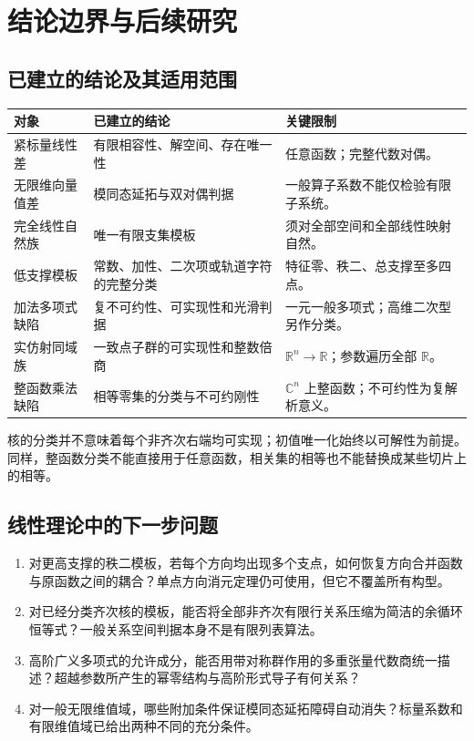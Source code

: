 \documentclass[11pt,a4paper,oneside,openany]{book}
\theoremstyle{lecture}
\newcommand{\R}{\mathbb R}
\newcommand{\C}{\mathbb C}
\numberwithin{equation}{section}
\begin{document}
\chapter{结论边界与后续研究}\label{ch:questions}
\section{已建立的结论及其适用范围}
\begin{longtable}{@{}p{}p{}p{}@{}}
\toprule 对象 & 已建立的结论 & 关键限制 \\\midrule
\endhead
紧标量线性差 & 有限相容性、解空间、存在唯一性 & 任意函数；完整代数对偶。\\
无限维向量值差 & 模同态延拓与双对偶判据 & 一般算子系数不能仅检验有限子系统。\\
完全线性自然族 & 唯一有限支集模板 & 须对全部空间和全部线性映射自然。\\
低支撑模板 & 常数、加性、二次项或轨道字符的完整分类 & 特征零、秩二、总支撑至多四点。\\
加法多项式缺陷 & 复不可约性、可实现性和光滑判据 & 一元一般多项式；高维二次型另作分类。\\
实仿射同域族 & 一致点子群的可实现性和整数倍商 & $\R^n\to\R$；参数遍历全部 $\R$。\\
整函数乘法缺陷 & 相等零集的分类与不可约刚性 & $\C^n$ 上整函数；不可约性为复解析意义。\\
\bottomrule
\end{longtable}
核的分类并不意味着每个非齐次右端均可实现；初值唯一化始终以可解性为前提。
同样，整函数分类不能直接用于任意函数，相关集的相等也不能替换成某些切片上的相等。

\section{线性理论中的下一步问题}
\begin{enumerate}
\item 对更高支撑的秩二模板，若每个方向均出现多个支点，如何恢复方向合并函数与原函数之间的耦合？单点方向消元定理仍可使用，但它不覆盖所有构型。
\item 对已经分类齐次核的模板，能否将全部非齐次有限行关系压缩为简洁的余循环恒等式？一般关系空间判据本身不是有限列表算法。
\item 高阶广义多项式的允许成分，能否用带对称群作用的多重张量代数商统一描述？超越参数所产生的幂零结构与高阶形式导子有何关系？
\item 对一般无限维值域，哪些附加条件保证模同态延拓障碍自动消失？标量系数和有限维值域已给出两种不同的充分条件。
\end{enumerate}
\end{document}
